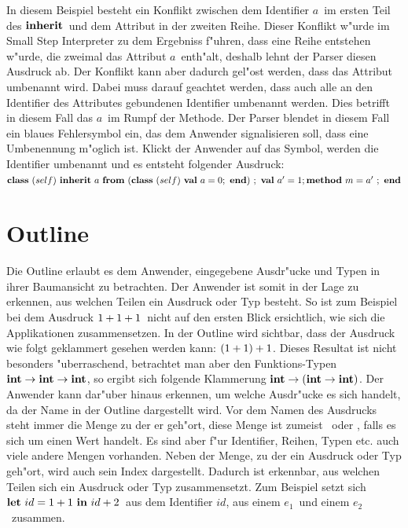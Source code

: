 In diesem Beispiel besteht ein Konflikt zwischen dem Identifier \glqq$a$\grqq\ 
im ersten Teil des \glqq$\binherit$\grqq\ und dem Attribut in der zweiten Reihe. Dieser 
Konflikt w"urde im Small Step Interpreter zu dem Ergebniss f"uhren, dass eine Reihe
entstehen w"urde, die zweimal das Attribut \glqq$a$\grqq\ enth"alt, deshalb
lehnt der Parser diesen Ausdruck ab. Der Konflikt kann aber dadurch gel"ost
werden, dass das Attribut umbenannt wird. Dabei muss darauf geachtet werden,
dass auch alle an den Identifier des Attributes gebundenen Identifier umbenannt
werden. Dies betrifft in diesem Fall das \glqq$a$\grqq\ im Rumpf der Methode.
Der Parser blendet in diesem Fall ein blaues Fehlersymbol ein, das dem Anwender
signalisieren soll, dass eine Umbenennung m"oglich ist. Klickt der Anwender auf
das Symbol, werden die Identifier umbenannt und es entsteht folgender Ausdruck:\\[2mm]
\glqq$\class{self}{\inherit{a}{(\class{self}{\val{a}{0}})}{\val{a'}{1} \method{m}{a'}}}$\grqq


\section {Outline}
\label{Outline}
Die Outline erlaubt es dem Anwender, eingegebene Ausdr"ucke und Typen
in ihrer Baumansicht zu betrachten. Der Anwender ist somit in der Lage
zu erkennen, aus welchen Teilen ein Ausdruck oder Typ besteht. So ist zum
Beispiel bei dem Ausdruck \glqq$\infix{+}{\infix{+}{1}{1}}{1}$\grqq\ nicht 
auf den ersten Blick ersichtlich, wie sich die Applikationen zusammensetzen. 
In der Outline wird sichtbar, dass der Ausdruck wie folgt geklammert gesehen
werden kann: \glqq$\infix{+}{(\infix{+}{1}{1})}{1}$\grqq. Dieses Resultat ist nicht
besonders "uberraschend, betrachtet man aber den Funktions-Typen
\glqq$\arrowtype{\inttype}{\arrowtype{\inttype}{\inttype}}$\grqq, so ergibt sich
folgende Klammerung \glqq$\arrowtype{\inttype}{(\arrowtype{\inttype}{\inttype})}$\grqq.
Der Anwender kann dar"uber hinaus erkennen, um welche Ausdr"ucke es sich
handelt, da der Name in der Outline dargestellt wird. Vor dem Namen des
Ausdrucks steht immer die Menge zu der er geh"ort, diese Menge ist zumeist
\glqq{\bf e}\grqq\ oder \glqq{\bf v}\grqq, falls es sich um einen Wert handelt.
Es sind aber f"ur Identifier, Reihen, Typen etc. auch viele andere Mengen
vorhanden. Neben der Menge, zu der ein Ausdruck oder Typ geh"ort, wird auch
sein Index dargestellt. Dadurch ist erkennbar, aus welchen Teilen sich ein
Ausdruck oder Typ zusammensetzt. Zum Beispiel setzt sich 
\glqq$\bli{id}{1+1}{id+2}$\grqq\ aus dem Identifier \glqq$id$\grqq, aus einem
\glqq$e_1$\grqq\ und einem \glqq$e_2$\grqq\ zusammen.

